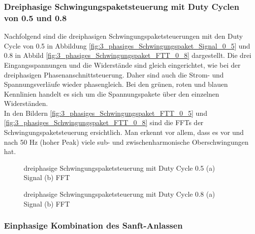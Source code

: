 \newpage

\subsubsection{Dreiphasige Schwingungspaketsteuerung mit Duty Cyclen von 0.5 und 0.8}
Nachfolgend sind die dreiphasigen Schwingungspaketsteuerungen mit den Duty Cycle von 0.5 in Abbildung \ref{fig:3_phasiges_Schwingungspaket_Signal_0_5} und 0.8 in Abbild \ref{fig:3_phasiges_Schwingungspaket_FTT_0_8} dargestellt. Die drei Eingangsspannungen und die Widerstände sind gleich eingerichtet, wie bei der dreiphasigen Phasenanschnittsteuerung. Daher sind auch die Strom- und Spannungsverläufe wieder phasengleich. Bei den grünen, roten und blauen Kennlinien handelt es sich um die Spannungspakete über den einzelnen Widerständen.\\
In den Bildern \ref{fig:3_phasiges_Schwingungspaket_FTT_0_5} und \ref{fig:3_phasiges_Schwingungspaket_FTT_0_8} sind die FFTs der Schwingungspaketsteuerung ersichtlich. Man erkennt vor allem, dass es vor und nach 50 Hz (hoher Peak) viele sub- und zwischenharmonische Oberschwingungen hat.

\begin{figure}[ht!]
	\centering
	\qquad
	\caption{dreiphasige Schwingungspaketsteuerung mit Duty Cycle 0.5 (a) Signal (b) FFT}
	\label{fig:3_phasiges_Schwingungspaket_0_5}
\end{figure}



\begin{figure}[ht!]
	\centering
	\qquad
	\caption{dreiphasige Schwingungspaketsteuerung mit Duty Cycle 0.8 (a) Signal (b) FFT}
	\label{fig:3_phasiges_Schwingungspaket_0_8}
\end{figure}

\newpage
\subsubsection{Einphasige Kombination des Sanft-Anlassen}


